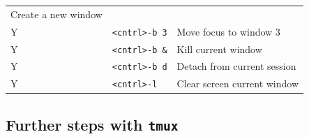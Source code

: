 \documentclass[]{krantz}
\begin{document}
\begin{longtable}[]{@{}lll@{}}
\begin{minipage}[t]{0.38\columnwidth}
Create a new window\strut
\end{minipage}\tabularnewline
\begin{minipage}[t]{0.18\columnwidth}\raggedright
Y\strut
\end{minipage} & \begin{minipage}[t]{0.36\columnwidth}\raggedright
\texttt{\textless{}cntrl\textgreater{}-b\ 3}\strut
\end{minipage} & \begin{minipage}[t]{0.38\columnwidth}\raggedright
Move focus to window 3\strut
\end{minipage}\tabularnewline
\begin{minipage}[t]{0.18\columnwidth}\raggedright
Y\strut
\end{minipage} & \begin{minipage}[t]{0.36\columnwidth}\raggedright
\texttt{\textless{}cntrl\textgreater{}-b\ \&}\strut
\end{minipage} & \begin{minipage}[t]{0.38\columnwidth}\raggedright
Kill current window\strut
\end{minipage}\tabularnewline
\begin{minipage}[t]{0.18\columnwidth}\raggedright
Y\strut
\end{minipage} & \begin{minipage}[t]{0.36\columnwidth}\raggedright
\texttt{\textless{}cntrl\textgreater{}-b\ d}\strut
\end{minipage} & \begin{minipage}[t]{0.38\columnwidth}\raggedright
Detach from current session\strut
\end{minipage}\tabularnewline
\begin{minipage}[t]{0.18\columnwidth}\raggedright
Y\strut
\end{minipage} & \begin{minipage}[t]{0.36\columnwidth}\raggedright
\texttt{\textless{}cntrl\textgreater{}-l}\strut
\end{minipage} & \begin{minipage}[t]{0.38\columnwidth}\raggedright
Clear screen current window\strut
\end{minipage}\tabularnewline
\bottomrule
\end{longtable}

\hypertarget{further-steps-with-tmux}{%
\subsection{\texorpdfstring{Further steps with \texttt{tmux}}{Further steps with tmux}}\label{further-steps-with-tmux}}
\end{document}

